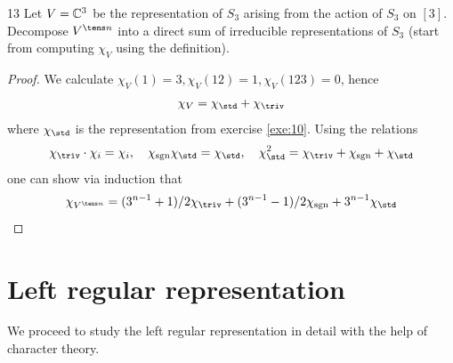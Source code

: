 \documentclass[twoside = false,	%
		headsepline,		%
		parskip = true,
		]{scrbook}						%
\begin{document}
    \begin{exercise}{}{13}
        Let $V = \mathbb C^3$ be the representation of $S_3$ arising from the action of $S_3$ on $[3]$. Decompose $V^{\tens n}$ into a direct sum of irreducible representations of $S_3$ (start from computing $\chi_V$ using the definition).
    \end{exercise}
    \begin{proof}
        We calculate $\chi_V(1) = 3, \chi_V(12) = 1, \chi_V(123) = 0$, hence
        \begin{equation*}
            \chi_V = \chi_{\std} + \chi_{\triv}
        \end{equation*}
        where $\chi_{\std}$ is the representation from exercise \ref{exe:10}. Using the relations
        \begin{equation*}
            \begin{split}
                \chi_\triv \cdot \chi_i = \chi_i, \quad \chi_\sgn \chi_\std = \chi_\std, \quad \chi_\std^2 = \chi_\triv + \chi_\sgn + \chi_\std
            \end{split}
        \end{equation*}
        one can show via induction that
        \begin{equation*}
            \chi_{V^{\tens n}} = (3^{n-1}+1)/2 \chi_\triv + (3^{n-1}-1)/2 \chi_\sgn + 3^{n-1} \chi_\std
        \end{equation*}
    \end{proof}
\section{Left regular representation}
    We proceed to study the left regular representation in detail with the help of character theory.
\end{document}
